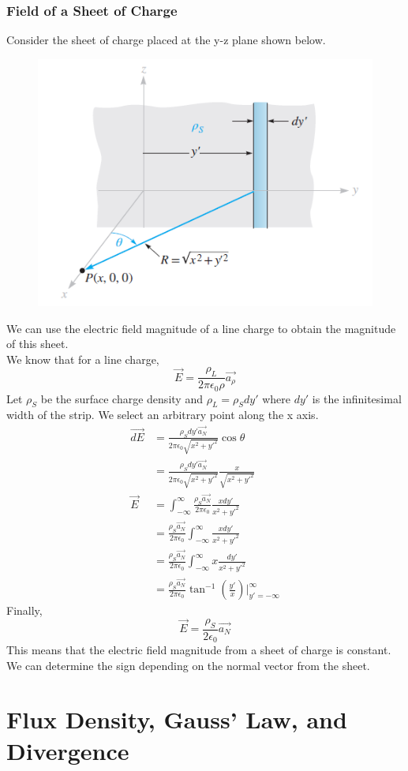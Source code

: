 \documentclass{article}
\begin{document}
\newpage 
\subsubsection{Field of a Sheet of Charge}
Consider the sheet of charge placed at the y-z plane shown below. 
\begin{figure}[H]
    \center
    \includegraphics[scale=0.55]{inf_sheet_charge}
\end{figure}
\noindent 
We can use the electric field magnitude of a line charge to obtain the magnitude of 
this sheet. 
\vspace{8pt}
\\ We know that for a line charge, 
\begin{equation*}
\vec{E} = \frac{\rho_L}{2\pi\epsilon_0\rho}\vec{a_\rho}
\end{equation*}
Let $\rho_S$ be the surface charge density and $\rho_L = \rho_S dy'$ where $dy'$ is the 
infinitesimal width of the strip. We select an arbitrary point along the x axis.   
\begin{align*}
\vec{dE} &= \frac{\rho_S dy'\vec{a_N}}{2\pi\epsilon_0\sqrt{x^2+y'^2}}\cos\theta \\
&= \frac{\rho_S dy'\vec{a_N}}{2\pi\epsilon_0\sqrt{x^2+y'^2}}\frac{x}{\sqrt{x^2+y'^2}} \\
\vec{E}&=\int_{-\infty}^{\infty}\frac{\rho_S \vec{a_N}}{2\pi\epsilon_0}\frac{xdy'}
{x^2+y'^2} \\
&= \frac{\rho_S \vec{a_N}}{2\pi\epsilon_0} \int_{-\infty}^{\infty} \frac{xdy'}
{x^2+y'^2}\\
&= \frac{\rho_S \vec{a_N}}{2\pi\epsilon_0} \int_{-\infty}^{\infty} x
\frac{dy'}{x^2+y'^2}\\
&= \frac{\rho_S \vec{a_N}}{2\pi\epsilon_0}\tan^{-1}\left(\frac{y'}{x}\right)
\Bigg|_{y'=-\infty}^{\infty}
\end{align*}
Finally,
$$\boxed{\vec{E}=\frac{\rho_S}{2\epsilon_0}\vec{a_N}}$$
This means that the electric field magnitude from a sheet of charge is constant.
We can determine the sign depending on the normal vector from the sheet. 

\newpage 
\section{Flux Density, Gauss' Law, and Divergence}
\noindent 
\end{document}
